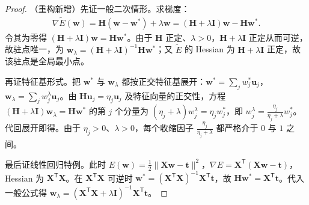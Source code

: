 \documentclass[../../main.tex]{subfiles}
\begin{document}
\begin{proof}
（重构新增）先证一般二次情形。求梯度：
\begin{align*}
\nabla\widetilde{E}(\boldsymbol{w})=\boldsymbol{H}(\boldsymbol{w}-\boldsymbol{w}^{*})+\lambda\boldsymbol{w}=(\boldsymbol{H}+\lambda\boldsymbol{I})\boldsymbol{w}-\boldsymbol{H}\boldsymbol{w}^{*}.
\end{align*}
令其为零得 $(\boldsymbol{H}+\lambda\boldsymbol{I})\boldsymbol{w}=\boldsymbol{H}\boldsymbol{w}^{*}$。由于 $\boldsymbol{H}$ 正定、$\lambda>0$，$\boldsymbol{H}+\lambda\boldsymbol{I}$ 正定从而可逆，故驻点唯一，为 $\boldsymbol{w}_{\lambda}=(\boldsymbol{H}+\lambda\boldsymbol{I})^{-1}\boldsymbol{H}\boldsymbol{w}^{*}$；又 $\widetilde E$ 的 Hessian 为 $\boldsymbol{H}+\lambda\boldsymbol{I}$ 正定，故该驻点是全局最小点。

再证特征基形式。把 $\boldsymbol{w}^{*}$ 与 $\boldsymbol{w}_{\lambda}$ 都按正交特征基展开：$\boldsymbol{w}^{*}=\sum_{j}w_{j}^{*}\boldsymbol{u}_{j}$，$\boldsymbol{w}_{\lambda}=\sum_{j}w_{j}^{\lambda}\boldsymbol{u}_{j}$。由 $\boldsymbol{H}\boldsymbol{u}_{j}=\eta_{j}\boldsymbol{u}_{j}$ 及特征向量的正交性，方程 $(\boldsymbol{H}+\lambda\boldsymbol{I})\boldsymbol{w}_{\lambda}=\boldsymbol{H}\boldsymbol{w}^{*}$ 的第 $j$ 个分量为 $(\eta_{j}+\lambda)w_{j}^{\lambda}=\eta_{j}w_{j}^{*}$，即 $w_{j}^{\lambda}=\frac{\eta_{j}}{\eta_{j}+\lambda}w_{j}^{*}$。代回展开即得。由于 $\eta_{j}>0$、$\lambda>0$，每个收缩因子 $\frac{\eta_{j}}{\eta_{j}+\lambda}$ 都严格介于 $0$ 与 $1$ 之间。

最后证线性回归特例。此时 $E(\boldsymbol{w})=\frac{1}{2}\|\boldsymbol{X}\boldsymbol{w}-\boldsymbol{t}\|^{2}$，$\nabla E=\boldsymbol{X}^{\mathsf T}(\boldsymbol{X}\boldsymbol{w}-\boldsymbol{t})$，Hessian 为 $\boldsymbol{X}^{\mathsf T}\boldsymbol{X}$。在 $\boldsymbol{X}^{\mathsf T}\boldsymbol{X}$ 可逆时 $\boldsymbol{w}^{*}=(\boldsymbol{X}^{\mathsf T}\boldsymbol{X})^{-1}\boldsymbol{X}^{\mathsf T}\boldsymbol{t}$，故 $\boldsymbol{H}\boldsymbol{w}^{*}=\boldsymbol{X}^{\mathsf T}\boldsymbol{t}$。代入一般公式得 $\boldsymbol{w}_{\lambda}=(\boldsymbol{X}^{\mathsf T}\boldsymbol{X}+\lambda\boldsymbol{I})^{-1}\boldsymbol{X}^{\mathsf T}\boldsymbol{t}$。
\end{proof}
\end{document}
